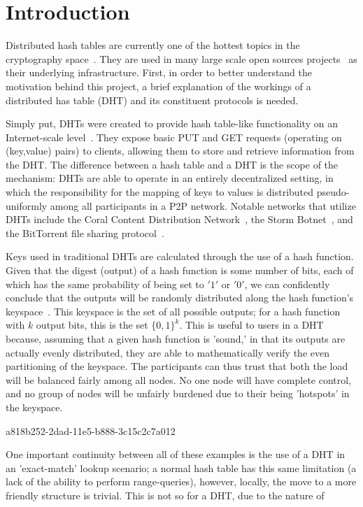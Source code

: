 \documentclass[12pt]{article}
\begin{document}
\section{Introduction}
\par Distributed hash tables are currently one of the hottest topics in the cryptography space~\cite{Stoica:2001dj,Rowstron:2001ea,Ratnasamy:2001wn}. They are used in many large scale open sources projects~\cite{Freitas:2013tb,Xu:2010vs,Perfitt:2010fh} as their underlying infrastructure. First, in order to better understand the motivation behind this project, a brief explanation of the workings of a distributed has table (DHT) and its constituent protocols is needed.

\par Simply put, DHTs were created to provide hash table-like functionality on an Internet-scale level~\cite{Ratnasamy:2001wn}. They expose basic PUT and GET requests (operating on (key,value) pairs) to clients, allowing them to store and retrieve information from the DHT. The difference between a hash table and a DHT is the scope of the mechanism: DHTs are able to operate in an entirely decentralized setting, in which the responsibility for the mapping of keys to values is distributed pseudo-uniformly among all participants in a P2P network. Notable networks that utilize DHTs include the Coral Content Distribution Network~\cite{Freedman:2004vb}, the Storm Botnet~\cite{Holz:2008uk}, and the BitTorrent file sharing protocol~\cite{Cohen:y1_8mBnw}.

\par Keys used in traditional DHTs are calculated through the use of a hash function. Given that the digest (output) of a hash function is some number of bits, each of which has the same probability of being set to $'1'$ or $'0'$, we can confidently conclude that the outputs will be randomly distributed along the hash function's keyspace~. This keyspace is the set of all possible outputs; for a hash function with $k$ output bits, this is the set $\{0,1\}^k$. This is useful to users in a DHT because, assuming that a given hash function is 'sound,' in that its outputs are actually evenly distributed, they are able to mathematically verify the even partitioning of the keyspace. The participants can thus trust that both the load will be balanced fairly among all nodes. No one node will have complete control, and no group of nodes will be unfairly burdened due to their being 'hotspots' in the keyspace.~

a818b252-2dad-11e5-b888-3c15c2c7a012\par One important continuity between all of these examples is the use of a DHT in an 'exact-match' lookup scenario; a normal hash table has this same limitation (a lack of the ability to perform range-queries), however, locally, the move to a more friendly structure is trivial. This is not so for a DHT, due to the nature of
\printbibliography
\end{document}
